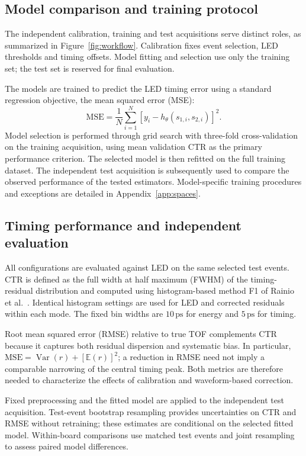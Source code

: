 \subsection{Model comparison and training protocol}
The independent calibration, training and test acquisitions serve distinct
roles, as summarized in Figure~\ref{fig:workflow}. Calibration fixes event
selection, LED thresholds and timing offsets. Model fitting and selection
use only the training set; the test set is reserved for
final evaluation.

The models are trained to predict the LED timing error using
a standard regression objective, the mean squared error (MSE):
\begin{equation}
\mathrm{MSE}=\frac{1}{N}\sum_{i=1}^{N}
\left[y_i-h_\theta(s_{1,i},s_{2,i})\right]^2.
\label{eq:training-mse}
\end{equation}
Model selection is performed through grid search with three-fold cross-validation
on the training acquisition, using mean validation CTR as the
primary performance criterion. The selected model is then
refitted on the full training dataset. The independent test
acquisition is subsequently used to compare the observed performance
of the tested estimators. 
Model-specific training procedures and exceptions are detailed in
Appendix~\ref{app:spaces}.


\subsection{Timing performance and independent evaluation}
All configurations are evaluated against LED on the same selected
test events. CTR is defined as the full width at half maximum
(FWHM) of the timing-residual distribution and computed using
histogram-based method F1 of Rainio et al.~\cite{rainio2025}.
Identical histogram settings are used for LED and corrected
residuals within each mode. The fixed bin widths are
$10\,\mathrm{ps}$ for energy and $5\,\mathrm{ps}$ for timing.

Root mean squared error (RMSE) relative to true TOF complements
CTR because it captures both residual dispersion and systematic
bias. In particular,
$\mathrm{MSE}=\operatorname{Var}(r)+[\mathbb{E}(r)]^2$;
a reduction in RMSE need not imply a comparable narrowing
of the central timing peak. Both metrics are therefore needed
to characterize the effects of calibration and waveform-based
correction.

Fixed preprocessing and the fitted model are applied to the
independent test acquisition. Test-event bootstrap resampling
provides uncertainties on CTR and RMSE without retraining;
these estimates are conditional on the selected fitted model.
Within-board comparisons use matched test events and joint
resampling to assess paired model differences.

